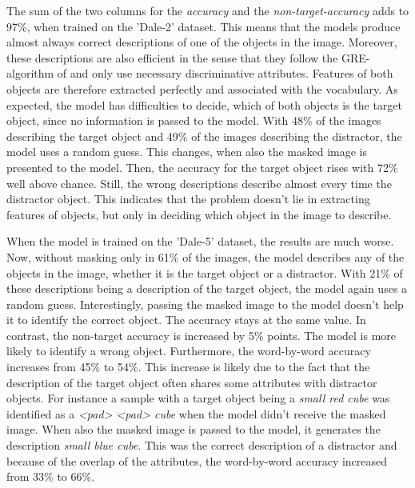 The sum of the two columns for the \emph{accuracy} and the \emph{non-target-accuracy} adds to 97\%, when trained on the 'Dale-2' dataset.
This means that the models produce almost always correct descriptions of one of the objects in the image.
Moreover, these descriptions are also efficient in the sense that they follow the GRE-algorithm of \citet{Dale1995} and only use necessary discriminative attributes.
Features of both objects are therefore extracted perfectly and associated with the vocabulary.
As expected, the model has difficulties to decide, which of both objects is the target object, since no information is passed to the model.
With 48\% of the images describing the target object and 49\% of the images describing the distractor, the model uses a random guess.
This changes, when also the masked image is presented to the model.
Then, the accuracy for the target object rises with 72\% well above chance.
Still, the wrong descriptions describe almost every time the distractor object.
This indicates that the problem doesn't lie in extracting features of objects, but only in deciding which object in the image to describe.

When the model is trained on the 'Dale-5' dataset, the results are much worse.
Now, without masking only in 61\% of the images, the model describes any of the objects in the image, whether it is the target object or a distractor.
With 21\% of these descriptions being a description of the target object, the model again uses a random guess.
Interestingly, passing the masked image to the model doesn't help it to identify the correct object.
The accuracy stays at the same value.
In contrast, the non-target accuracy is increased by 5\% points.
The model is more likely to identify a wrong object.
Furthermore, the word-by-word accuracy increases from 45\% to 54\%.
This increase is likely due to the fact that the description of the target object often shares some attributes with distractor objects.
For instance a sample with a target object being a \emph{small red cube} was identified as a \emph{<pad> <pad> cube} when the model didn't receive the masked image.
When also the masked image is passed to the model, it generates the description \emph{small blue cube}.
This was the correct description of a distractor and because of the overlap of the attributes, the word-by-word accuracy increased from 33\% to 66\%.

